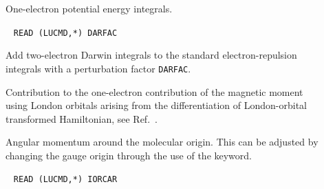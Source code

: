 \begin{description}
\item[] One-electron potential energy integrals.


\item[]\verb| |\newline
\verb|READ (LUCMD,*) DARFAC|


Add two-electron Darwin integrals to the standard electron-repulsion
integrals with a perturbation factor \verb|DARFAC|.

\item[] Contribution to the one-electron contribution of
the magnetic moment using London orbitals
 arising from the differentiation of London-orbital transformed Hamiltonian, see Ref.~\cite{thpjjcp95}.


\item[] Angular momentum around the molecular origin.
This can be adjusted by changing the gauge origin through the use of
the  keyword.


\item[]\verb| |\newline
\verb|READ (LUCMD,*) IORCAR|


\end{description}
